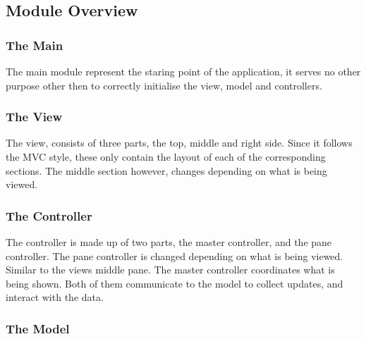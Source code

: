 \subsection{Module Overview}
\label{subsec:module_overview}

\subsubsection{The Main}
\label{subsubsec:main}

The main module represent the staring point of the application, it serves no other purpose other then to correctly initialise the view, model and controllers.

\subsubsection{The View}
\label{subsubsec:the_view}

The view, consists of three parts, the top, middle and right side. Since it follows the MVC style, these only contain the layout of each of the corresponding sections. The middle section however, changes depending on what is being viewed.

\subsubsection{The Controller}
\label{subsubsec:the_controller}

The controller is made up of two parts, the master controller, and the pane controller. The pane controller is changed depending on what is being viewed. Similar to the views middle pane. The master controller coordinates what is being shown. Both of them communicate to the model to collect updates, and interact with the data.

\subsubsection{The Model}
\label{subsubsec:the_model}

